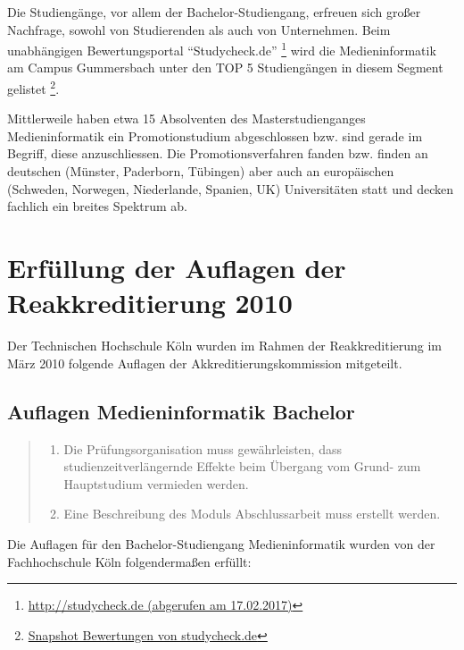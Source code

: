 Die Studiengänge, vor allem der Bachelor-Studiengang, erfreuen sich
großer Nachfrage, sowohl von Studierenden als auch von Unternehmen. Beim
unabhängigen Bewertungsportal ``Studycheck.de'' \footnote{\href{http://studycheck.de}{http://studycheck.de
  (abgerufen am 17.02.2017)}} wird die Medieninformatik am Campus
Gummersbach unter den TOP 5 Studiengängen in diesem Segment gelistet
\footnote{\href{../anhaenge/snapshot_2017_02_17_bewertungen_studiengang_medieninformatik_auf_studycheck_._de}{Snapshot
  Bewertungen von studycheck.de}}.

Mittlerweile haben etwa 15 Absolventen des Masterstudienganges
Medieninformatik ein Promotionstudium abgeschlossen bzw. sind gerade im
Begriff, diese anzuschliessen. Die Promotionsverfahren fanden bzw.
finden an deutschen (Münster, Paderborn, Tübingen) aber auch an
europäischen (Schweden, Norwegen, Niederlande, Spanien, UK)
Universitäten statt und decken fachlich ein breites Spektrum ab.

\section{Erfüllung der Auflagen der Reakkreditierung
2010}\label{erfuxfcllung-der-auflagen-der-reakkreditierung-2010}

Der Technischen Hochschule Köln wurden im Rahmen der Reakkreditierung im
März 2010 folgende Auflagen der Akkreditierungskommission mitgeteilt.

\subsection{Auflagen Medieninformatik
Bachelor}\label{auflagen-medieninformatik-bachelor}

\begin{quote}
\begin{enumerate}
\def\labelenumi{\arabic{enumi}.}
\tightlist
\item
  Die Prüfungsorganisation muss gewährleisten, dass
  studienzeitverlängernde Effekte beim Übergang vom Grund- zum
  Hauptstudium vermieden werden.
\item
  Eine Beschreibung des Moduls Abschlussarbeit muss erstellt werden.
\end{enumerate}
\end{quote}

Die Auflagen für den Bachelor-Studiengang Medieninformatik wurden von
der Fachhochschule Köln folgendermaßen erfüllt:

